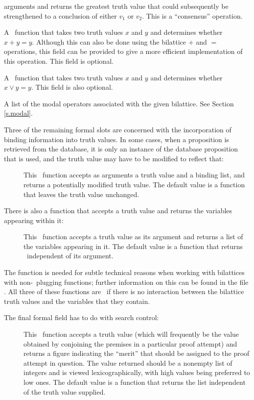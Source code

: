 \begin{description}
arguments and returns the greatest truth value that could
subsequently be strengthened to a conclusion of either $v_1$ or
$v_2$.  This is a ``consensus'' operation.
 \item [\itype{kle}] A \lisp\ function that takes two truth values $x$
and $y$ and determines whether $x+y=y$.  Although this can also
be done using the bilattice $+$ and $=$ operations, this field can be
provided to give a more efficient implementation of this operation.
This field is optional.
 \item [\itype{tle}] A \lisp\ function that takes two truth values $x$
and $y$ and determines whether $x\vee y=y$.  This field is also
optional.
 \item [\itype{modal-ops}] A list of the modal operators associated
with the given bilattice.  See Section \ref{s.modal}.
 \end{description}

Three of the remaining formal slots are concerned with the incorporation
of binding information into truth values.  In some cases, when a
proposition is retrieved from the database, it is only an instance of
the database proposition that is used, and the truth value may have to
be modified to reflect that:
 \begin{description}
 \item []  This \lisp\ function accepts as arguments
a truth value and a binding list, and returns a potentially modified
truth value.  The default value is a function that leaves the truth
value unchanged.
 \end{description}

There is also a function that accepts a truth value and returns the
variables appearing within it:
 \begin{description}
 \item []  This \lisp\ function accepts a truth value
as its argument and returns a list of the variables appearing in it.
The default value is a function that returns \NIL\ independent of its
argument.
 \end{description}

The function  is needed for subtle technical reasons
when working with bilattices with non-\NIL\ plugging functions;
further information on this can be found in the file .
All three of these functions are \NIL\ if there is no interaction
between the bilattice truth values and the variables that they
contain.

The final formal field has to do with search control:
 \begin{description}
 \item [] This \lisp\ function accepts a truth
value (which will frequently be the value obtained by conjoining the
premises in a particular proof attempt) and returns a figure
indicating the ``merit'' that should be assigned to the proof attempt
in question.  The value returned should be a nonempty list of
integers and is viewed lexicographically, with high values being
preferred to low ones.  The default value is a function that returns
the list  independent of the truth value supplied.
 \end{description}

